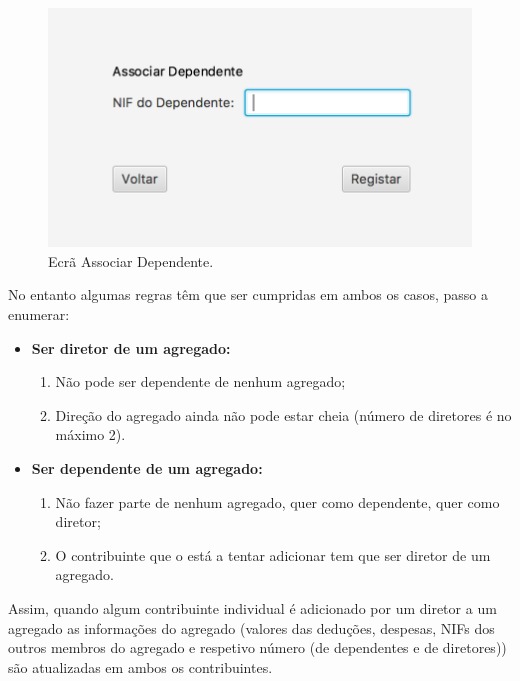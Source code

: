 \documentclass[a4paper]{article}
\begin{document}
\begin{figure}[H]
\centering
\includegraphics[scale=0.35]{imgs/associardependente.png}
\caption{Ecrã Associar Dependente.}
\label{img:associardependente}
\end{figure}

No entanto algumas regras têm que
ser cumpridas em ambos os casos, passo a enumerar:


\begin{itemize}
\item \textbf{Ser diretor de um agregado:}

\begin{enumerate}
\item Não pode ser dependente de nenhum agregado;
\item Direção do agregado ainda não pode estar cheia
(número de diretores é no máximo 2).
\end{enumerate}


\item \textbf{Ser dependente de um agregado:}

\begin{enumerate}
\item Não fazer parte de nenhum agregado, quer como dependente, quer como diretor;
\item O contribuinte que o está a tentar adicionar tem que ser diretor de um agregado.
\end{enumerate}
\end{itemize}

Assim, quando algum contribuinte individual é adicionado por um diretor a um agregado
as informações do agregado (valores das deduções, despesas, NIFs dos outros membros do
agregado e respetivo número (de dependentes e de diretores)) são atualizadas em ambos
os contribuintes.

\vspace{1cm}
\end{document}
